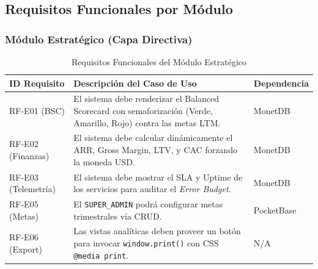 \documentclass[11pt, letterpaper]{article}
\begin{document}
\subsection{Requisitos Funcionales por Módulo}

\subsubsection{Módulo Estratégico (Capa Directiva)}
\begin{table}[H]
\small
\centering
\begin{tabularx}{\linewidth}{>{\raggedright\arraybackslash}p{2.5cm} >{\raggedright\arraybackslash}X >{\raggedright\arraybackslash}p{2cm}}
\toprule
\textbf{ID Requisito} & \textbf{Descripción del Caso de Uso} & \textbf{Dependencia} \\
\midrule
RF-E01 (BSC) & El sistema debe renderizar el Balanced Scorecard con semaforización (Verde, Amarillo, Rojo) contra las metas LTM. & MonetDB \\
\midrule
RF-E02 (Finanzas) & El sistema debe calcular dinámicamente el ARR, Gross Margin, LTV, y CAC forzando la moneda USD. & MonetDB \\
\midrule
RF-E03 (Telemetría) & El sistema debe mostrar el SLA y Uptime de los servicios para auditar el \textit{Error Budget}. & MonetDB \\
\midrule
RF-E05 (Metas) & El \texttt{SUPER\_ADMIN} podrá configurar metas trimestrales vía CRUD. & PocketBase \\
\midrule
RF-E06 (Export) & Las vistas analíticas deben proveer un botón para invocar \texttt{window.print()} con CSS \texttt{@media print}. & N/A \\
\bottomrule
\end{tabularx}
\caption{Requisitos Funcionales del Módulo Estratégico}
\end{table}
\end{document}
